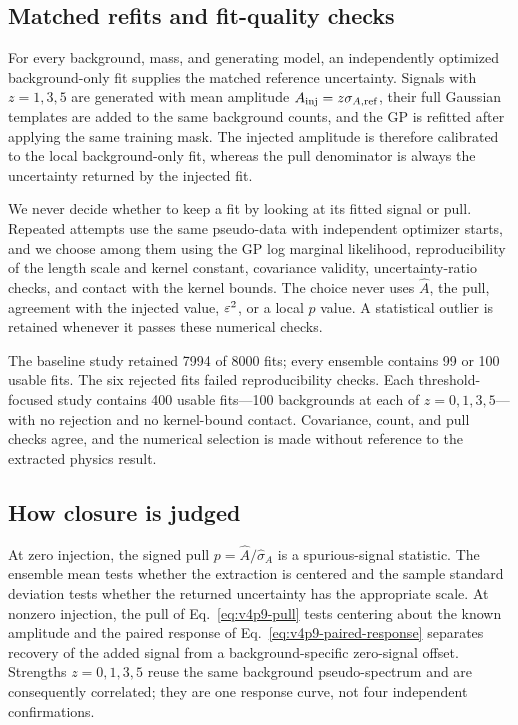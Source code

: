 \subsection{Matched refits and fit-quality checks}

For every background, mass, and generating model, an independently optimized background-only
fit supplies the matched reference uncertainty.  Signals with
$z=1,3,5$ are generated with mean amplitude
$A_{\rm inj}=z\sigma_{A,{\rm ref}}$, their full Gaussian templates are added to the
same background counts, and the GP is refitted after applying the same training mask.
The injected amplitude is therefore calibrated to the local background-only fit,
whereas the pull denominator is always the uncertainty returned by the injected fit.

We never decide whether to keep a fit by looking at its fitted signal or pull.
Repeated attempts use the same pseudo-data with independent optimizer starts, and we choose among them using
the GP log marginal likelihood, reproducibility of the length scale and kernel
constant, covariance validity, uncertainty-ratio checks, and contact with the kernel
bounds.  The choice never uses $\widehat A$, the pull, agreement with the injected
value, $\varepsilon^2$, or a local $p$ value.  A statistical outlier is retained whenever it
passes these numerical checks.

The baseline study retained 7994 of 8000 fits; every ensemble contains 99 or 100 usable
fits. The six rejected fits failed reproducibility checks. Each threshold-focused study
contains 400 usable fits---100 backgrounds at each of $z=0,1,3,5$---with no rejection
and no kernel-bound contact. Covariance, count, and pull checks agree, and the numerical
selection is made without reference to the extracted physics result.

\subsection{How closure is judged}

At zero injection, the signed pull
$p=\widehat A/\widehat\sigma_A$ is a spurious-signal statistic. The ensemble mean
tests whether the extraction is centered and the sample standard deviation tests
whether the returned uncertainty has the appropriate scale. At nonzero injection,
the pull of Eq.~\eqref{eq:v4p9-pull} tests centering about the known amplitude and the
paired response of Eq.~\eqref{eq:v4p9-paired-response} separates recovery of the
added signal from a background-specific zero-signal offset. Strengths
$z=0,1,3,5$ reuse the same background pseudo-spectrum and are consequently
correlated; they are one response curve, not four independent confirmations.

